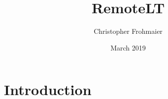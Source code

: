 \documentclass{article}
\title{RemoteLT}
\author{Christopher Frohmaier}
\date{March 2019}
\begin{document}
\maketitle

\section{Introduction}
\end{document}
